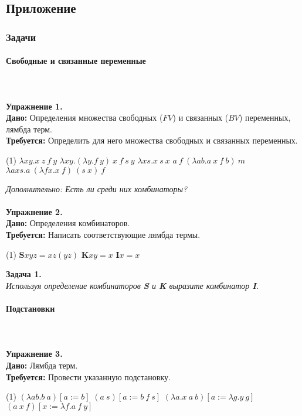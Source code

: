 \documentclass[lambda.tex]{subfiles}
\begin{document}
\subsection*{Приложение}
\subsubsection*{Задачи}
\paragraph{Свободные и связанные переменные}~\\\\
\textbf{Упражнение 1.}~\\
\textbf{Дано:} Определения множества свободных ($FV$) и связанных ($BV$) переменных, лямбда терм.\\
\textbf{Требуется:} Определить для него множества свободных и связанных переменных.
\begin{tasks}(1)
	\task $\lambda xy.x\ z\ f\ y$
	\task $\lambda xy.(\lambda y.f\ y)\ x\ f\ s\ y$
	\task $\lambda xs.x\ s\ x$
	\task $a\ f\ (\lambda ab.a\ x\ f\ b)\ m$
	\task $\lambda axs.a\ (\lambda fx.x\ f)\ (s\ x)\ f$
\end{tasks}
\emph{Дополнительно: Есть ли среди них комбинаторы?}\\
\\
\textbf{Упражнение 2.}~\\
\textbf{Дано:} Определения комбинаторов.\\
\textbf{Требуется:} Написать соответствующие лямбда термы.
\begin{tasks}(1)
	\task $\boldsymbol{S}xyz = xz(yz)$
	\task $\boldsymbol{K}xy = x$
    \task $\boldsymbol{I}x = x$
\end{tasks}
\textbf{Задача 1.}~\\
\emph{Используя определение комбинаторов \textbf{S} и \textbf{K} выразите комбинатор \textbf{I}.}
\paragraph{Подстановки}~\\\\
\textbf{Упражнение 3.}\\
\textbf{Дано:} Лямбда терм.\\
\textbf{Требуется:} Провести указанную подстановку.
\begin{tasks}(1)
	\task $(\lambda ab.b\ a)[a:=b]$
	\task $(a\ s)[a:=b\ f\ s]$
	\task $(\lambda a.x\ a\ b)[a:=\lambda g.y\ g]$
	\task $(a\ x\ f)[x:=\lambda f.a\ f\ y]$
\end{tasks}
\end{document}
